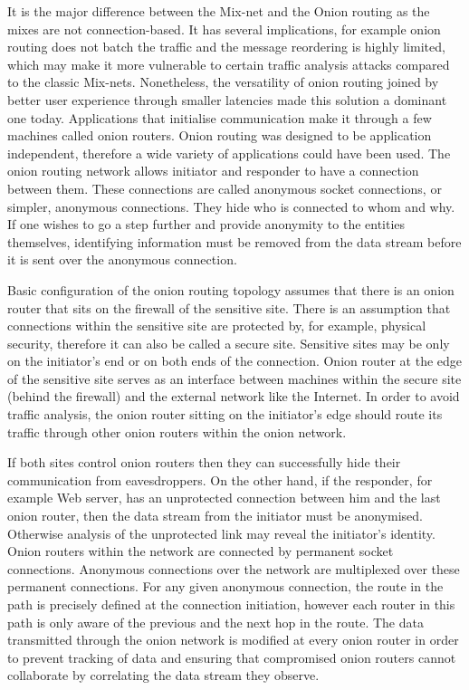It is the major difference between the Mix-net and the Onion routing as the mixes are not connection-based. It has several implications, for example onion routing does not batch the traffic and the message reordering is highly limited, which may make it more vulnerable to certain traffic analysis attacks compared to the classic Mix-nets. Nonetheless, the versatility of onion routing joined by better user experience through smaller latencies made this solution a dominant one today.
Applications that initialise communication make it through a few machines called onion routers. Onion routing was designed to be application independent, therefore a wide variety of applications could have been used. The onion routing network allows initiator and responder to have a connection between them. These connections are called anonymous socket connections, or simpler, anonymous connections. They hide who is connected to whom and why. If one wishes to go a step further and provide anonymity to the entities themselves, identifying information must be removed from the data stream before it is sent over the anonymous connection.

Basic configuration of the onion routing topology assumes that there is an onion router that sits on the firewall of the sensitive site. There is an assumption that connections within the sensitive site are protected by, for example, physical security, therefore it can also be called a secure site. Sensitive sites may be only on the initiator’s end or on both ends of the connection. Onion router at the edge of the sensitive site serves as an interface between machines within the secure site (behind the firewall) and the external network like the Internet. In order to avoid traffic analysis, the onion router sitting on the initiator’s edge should route its traffic through other onion routers within the onion network.

If both sites control onion routers then they can successfully hide their communication from eavesdroppers. On the other hand, if the responder, for example Web server, has an unprotected connection between him and the last onion router, then the data stream from the initiator must be anonymised. Otherwise analysis of the unprotected link may reveal the initiator’s identity.
Onion routers within the network are connected by permanent socket connections. Anonymous connections over the network are multiplexed over these permanent connections. For any given anonymous connection, the route in the path is precisely defined at the connection initiation, however each router in this path is only aware of the previous and the next hop in the route. The data transmitted through the onion network is modified at every onion router in order to prevent tracking of data and ensuring that compromised onion routers cannot collaborate by correlating the data stream they observe.

